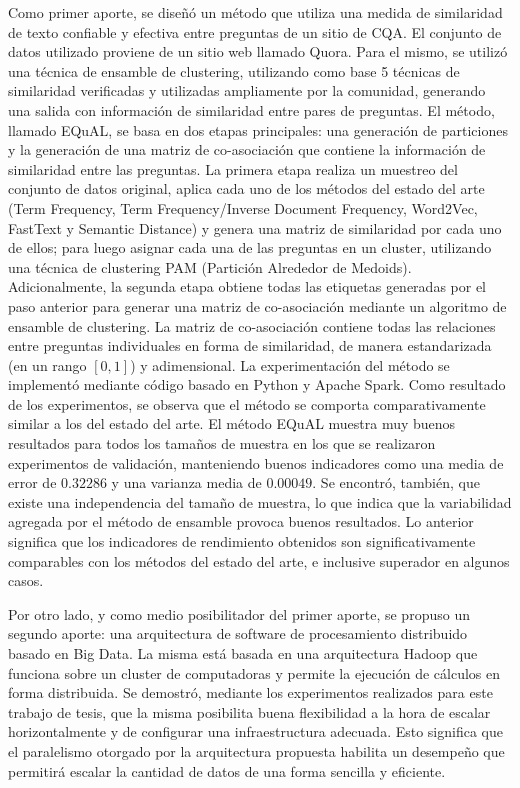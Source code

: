 \bigskip Como primer aporte, se diseñó un método que utiliza una medida de similaridad de texto confiable y efectiva entre preguntas de un sitio de CQA. El conjunto de datos utilizado proviene de un sitio web llamado Quora. Para el mismo, se utilizó una técnica de ensamble de clustering, utilizando como base 5 técnicas de similaridad verificadas y utilizadas ampliamente por la comunidad, generando una salida con información de similaridad entre pares de preguntas. El método, llamado EQuAL, se basa en dos etapas principales: una generación de particiones y la generación de una matriz de co-asociación que contiene la información de similaridad entre las preguntas. La primera etapa realiza un muestreo del conjunto de datos original, aplica cada uno de los métodos del estado del arte (Term Frequency, Term Frequency/Inverse Document Frequency, Word2Vec, FastText y Semantic Distance) y genera una matriz de similaridad por cada uno de ellos; para luego asignar cada una de las preguntas en un cluster, utilizando una técnica de clustering PAM (Partición Alrededor de Medoids). Adicionalmente, la segunda etapa obtiene todas las etiquetas generadas por el paso anterior para generar una matriz de co-asociación mediante un algoritmo de ensamble de clustering. La matriz de co-asociación contiene todas las relaciones entre preguntas individuales en forma de similaridad, de manera estandarizada (en un rango \([0,1]\)) y adimensional. La experimentación del método se implementó mediante código basado en Python y Apache Spark. Como resultado de los experimentos, se observa que el método se comporta comparativamente similar a los del estado del arte. El método EQuAL muestra muy buenos resultados para todos los tamaños de muestra en los que se realizaron experimentos de validación, manteniendo buenos indicadores como una media de error de \(0.32286\) y una varianza media de \(0.00049\). Se encontró, también, que existe una independencia del tamaño de muestra, lo que indica que la variabilidad agregada por el método de ensamble provoca buenos resultados. Lo anterior significa que los indicadores de rendimiento obtenidos son significativamente comparables con los métodos del estado del arte, e inclusive superador en algunos casos.

\bigskip Por otro lado, y como medio posibilitador del primer aporte, se propuso un segundo aporte: una arquitectura de software de procesamiento distribuido basado en Big Data. La misma está basada en una arquitectura Hadoop que funciona sobre un cluster de computadoras y permite la ejecución de cálculos en forma distribuida. Se demostró, mediante los experimentos realizados para este trabajo de tesis, que la misma posibilita buena flexibilidad a la hora de escalar horizontalmente y de configurar una infraestructura adecuada. Esto significa que el paralelismo otorgado por la arquitectura propuesta habilita un desempeño que permitirá escalar la cantidad de datos de una forma sencilla y eficiente.

